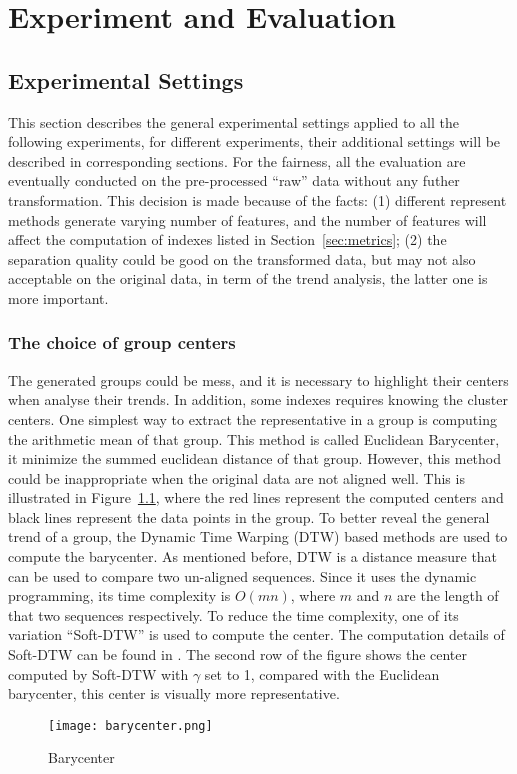 \chapter{Experiment and Evaluation}

\section{Experimental Settings}
This section describes the general experimental settings applied to all the following experiments, for different experiments, their additional settings will be described in corresponding sections. For the fairness, all the evaluation are eventually conducted on the pre-processed ``raw'' data without any futher transformation. This decision is made because of the facts: (1)
different represent methods generate varying number of features, and the number of features will affect the computation of indexes listed in Section~\ref{sec:metrics}; (2) the separation quality could be good on the transformed data, but may not also acceptable on the original data, in term of the trend analysis, the latter one is more important. 

\subsection{The choice of group centers}
The generated groups could be mess, and it is necessary to highlight their centers when analyse their trends. In addition, some indexes requires knowing the cluster centers. One simplest way to extract the representative in a group is computing the arithmetic mean of that group. This method is called Euclidean Barycenter, it minimize the summed euclidean distance of that group. However, this method could be inappropriate when the original data are not aligned well. This is illustrated in Figure~\ref{fig:barycenter1}, where the red lines represent the computed centers and black lines represent the data points in the group. To better reveal the general trend of a group, the Dynamic Time Warping (DTW) based methods are used to compute the barycenter. As mentioned before, DTW is a distance measure that can be used to compare two un-aligned sequences. Since it uses the dynamic programming, its time complexity is $O(mn)$, where $m$ and $n$ are the length of that two sequences respectively. To reduce the time complexity, one of its variation ``Soft-DTW'' is used to compute the center. The computation details of Soft-DTW can be found in \cite{schultz2018nonsmooth}. The second row of the figure shows the center computed by Soft-DTW with $\gamma$ set to 1, compared with the Euclidean barycenter, this center is visually more representative. 
\begin{figure}[!htbp]
    \centering
    \texttt{[image: barycenter.png]}
    \caption{Barycenter}
    \label{fig:barycenter1}
\end{figure} 

